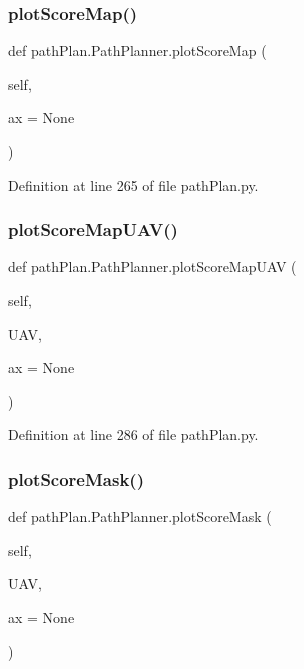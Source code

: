 \subsubsection{\texorpdfstring{plot\+Score\+Map()}{plotScoreMap()}}
{\footnotesize\ttfamily def path\+Plan.\+Path\+Planner.\+plot\+Score\+Map (\begin{DoxyParamCaption}\item[{}]{self,  }\item[{}]{ax = {\ttfamily None} }\end{DoxyParamCaption})}



Definition at line 265 of file path\+Plan.\+py.

\mbox{\label{classpath_plan_1_1_path_planner_aa5506bc585bd5f1d3fa76d0e383b0cc2}} 
\subsubsection{\texorpdfstring{plot\+Score\+Map\+U\+A\+V()}{plotScoreMapUAV()}}
{\footnotesize\ttfamily def path\+Plan.\+Path\+Planner.\+plot\+Score\+Map\+U\+AV (\begin{DoxyParamCaption}\item[{}]{self,  }\item[{}]{U\+AV,  }\item[{}]{ax = {\ttfamily None} }\end{DoxyParamCaption})}



Definition at line 286 of file path\+Plan.\+py.

\mbox{\label{classpath_plan_1_1_path_planner_a6e74d35801d637631580333ea9210aa5}} 
\subsubsection{\texorpdfstring{plot\+Score\+Mask()}{plotScoreMask()}}
{\footnotesize\ttfamily def path\+Plan.\+Path\+Planner.\+plot\+Score\+Mask (\begin{DoxyParamCaption}\item[{}]{self,  }\item[{}]{U\+AV,  }\item[{}]{ax = {\ttfamily None} }\end{DoxyParamCaption})}



